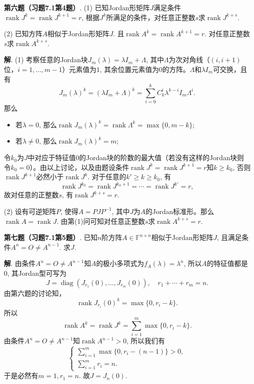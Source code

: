 \newpageorvspace


{\bf 第六题（习题7.1第4题）}. (1) 已知Jordan形矩阵$J$满足条件$\operatorname{rank} J^k = \operatorname{rank} J^{k+1} = r$, 根据$J^k$所满足的条件，对任意正整数$s$求$\operatorname{rank} J^{k+s}$.

(2) 已知方阵$A$相似于Jordan形矩阵$J$. 且$\operatorname{rank} A^k = \operatorname{rank} A^{k+1} = r$. 对任意正整数$s$求$\operatorname{rank} A^{k+s}$.

{\bf 解}. (1) 考察任意的Jordan块$J_m(\lambda) = \lambda I_m + \Lambda$, 其中$\Lambda$为次对角线（$(i,i+1)$位，$i=1,\ldots,m-1$）元素值为$1$, 其余位置元素值为$0$的方阵。$\Lambda$和$\lambda I_m$可交换，且有
$$J_m(\lambda)^k = (\lambda I_m + \Lambda)^k = \sum\limits_{i=0}^k C_{k}^i \lambda^{k-i} I_m \Lambda^{i}.$$
那么
\begin{itemize}
\item 若$\lambda = 0$, 那么$\operatorname{rank} J_m(\lambda)^k = \operatorname{rank} \Lambda^k = \max\{0, m-k\}$;
\item 若$\lambda \neq 0$, 那么$\operatorname{rank} J_m(\lambda)^k = m$;
\end{itemize}
令$k_0$为$J$中对应于特征值$0$的Jordan块的阶数的最大值（若没有这样的Jordan块则令$k_0 = 0$）。由以上讨论，以及由题设条件$\operatorname{rank} J^k = \operatorname{rank} J^{k+1} = r$知$k \geqslant k_0$, 否则$\operatorname{rank} J^{k+1}$必然小于$\operatorname{rank} J^k$. 对于任意的$k'\geqslant k \geqslant k_0$, 有
$$\operatorname{rank} J^{k_0} = \operatorname{rank} J^{k_0+1} = \cdots = \operatorname{rank} J^{k'} = r,$$
故对任意的正整数$s$, 有$\operatorname{rank} J^{k+s} = r$.

(2) 设有可逆矩阵$P$, 使得$A = PJP^{-1}$, 其中$J$为$A$的Jordan标准形。那么$\operatorname{rank} A = \operatorname{rank} J$. 由第(1)问可知对任意正整数$s$求$\operatorname{rank} A^{k+s} = r$.

\newpageorvspace


{\bf 第七题（习题7.1第5题）}. 已知$n$阶方阵$A \in \mathbb{F}^{n\times n}$相似于Jordan形矩阵$J$, 且满足条件$A^n = O \neq A^{n-1}$. 求$J$.

{\bf 解}. 由条件$A^n = O \neq A^{n-1}$知$A$的极小多项式为$f_A(\lambda) = \lambda^n$, 所以$A$的特征值都是$0$, 其Jordan型可写为
$$J = \operatorname{diag} (J_{r_1}(0), \ldots, J_{r_m}(0)), \quad r_1 + \cdots + r_m = n.$$
由第六题的讨论知，
$$\operatorname{rank} J_{r_i}(0)^k = \max\{0, r_i-k\}.$$
所以
$$\operatorname{rank} A^k = \operatorname{rank} J^k = \sum\limits_{i=1}^m \max\{0, r_i-k\}.$$
由条件$A^n = O \neq A^{n-1}$知$\operatorname{rank} A^{n-1} > 0$, 所以我们有
$$
\begin{cases}
\sum\limits_{i=1}^m \max\{0, r_i - (n-1)\} > 0, \\
\sum\limits_{i=1}^m r_i = n.
\end{cases}
$$
于是必然有$m = 1, r_1 = n$. 故$J = J_n(0)$.


